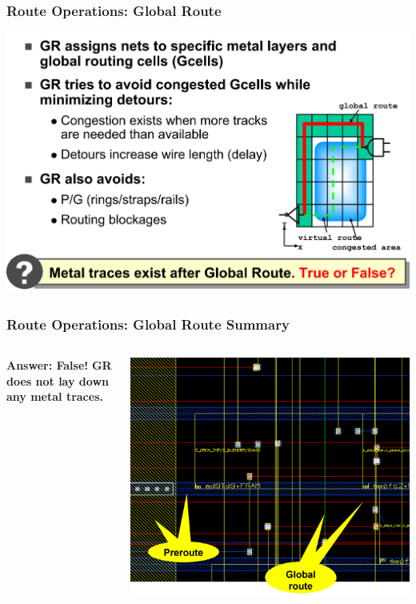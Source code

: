 \documentclass[compress]{beamer}
\begin{document}
\begin{frame}
	\frametitle{Route Operations: Global Route}
	\begin{center}
		\includegraphics[width=\textwidth]{groute}
	\end{center}

\end{frame}
\begin{frame}
	\frametitle{Route Operations: Global Route Summary}
	\begin{columns}
		\textbf{Answer: False!} \newline
		\textbf{GR does not lay down any metal traces.}
			\begin{center}
			\includegraphics[width=\textwidth]{groute2}
		\end{center}
	\end{columns}
\end{frame}
\end{document}
